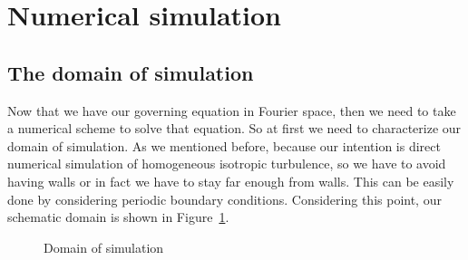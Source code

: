 \documentclass[12pt]{article}
\begin{document}
\section{Numerical simulation}
\subsection{The domain of simulation}
Now that we have our governing equation  in Fourier space, then we need to take a numerical scheme to solve that equation. So at first we need to characterize our domain of simulation. As we mentioned before, because our intention is direct numerical simulation of homogeneous isotropic turbulence, so we have to avoid having walls or in fact we have to stay far enough from walls. This can be easily done by considering periodic boundary conditions. Considering this point, our schematic domain is shown in Figure~\ref{domain}. 
\begin{figure}[ht]
\begin{center}
\caption{Domain of simulation}\label{domain}
\end{center}
\end{figure}
\end{document}
